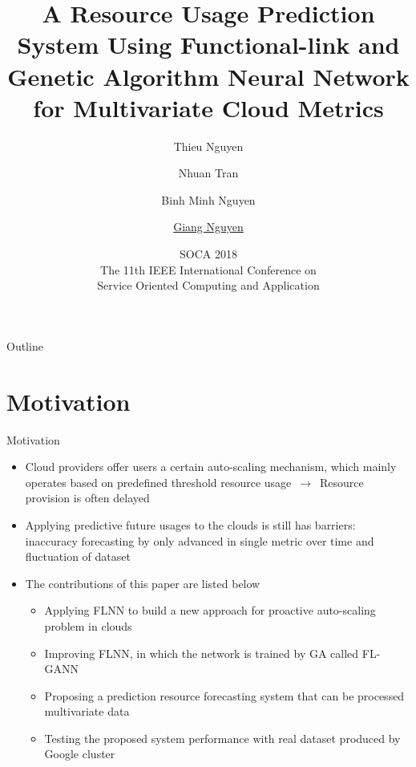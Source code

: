 \documentclass{beamer}
\title{\large A Resource Usage Prediction System Using Functional-link and Genetic Algorithm Neural Network for Multivariate Cloud Metrics}
\author{\small Thieu Nguyen \and Nhuan Tran \and Binh Minh Nguyen \\ \and \underline{Giang Nguyen}}
\institute{ Institute of Informatics\\ Slovak Academy of Sciences, Bratislava, Slovakia}
\date{SOCA 2018\\
	The 11th IEEE International Conference on\\ Service Oriented Computing and Application}
\begin{document}
\begin{frame}
  \titlepage
\end{frame}

\begin{frame}{Outline}
  \tableofcontents
\end{frame}


\section{Motivation}
\begin{frame}{Motivation}
	\begin{itemize}
		\item {Cloud providers offer users a certain auto-scaling mechanism, which mainly operates based on predefined threshold resource usage $\,\to\,$ Resource provision is often delayed}
		\item {Applying predictive future usages to the clouds is still has barriers: inaccuracy forecasting by only advanced in single metric over time and fluctuation of dataset}
		\item {The contributions of this paper are listed below}
		\begin{itemize}
			\item Applying FLNN to build a new approach for proactive auto-scaling problem in clouds
			\item Improving FLNN, in which the network is trained by GA called FL-GANN
			\item Proposing a prediction resource forecasting system that can be processed multivariate data
			\item Testing the proposed system performance with real dataset produced by Google cluster
			
		\end{itemize}
		
	\end{itemize}
\end{frame}
\end{document}
